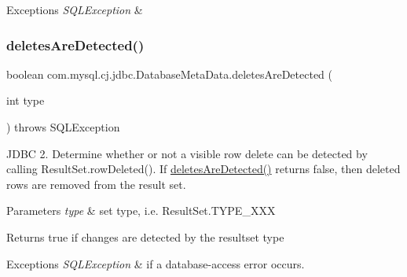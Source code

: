 \begin{DoxyExceptions}{Exceptions}
{\em S\+Q\+L\+Exception} & \\
\hline
\end{DoxyExceptions}
\mbox{\label{classcom_1_1mysql_1_1cj_1_1jdbc_1_1_database_meta_data_ada4d6165180e979eeb0645fadd72aaf9}} 
\subsubsection{\texorpdfstring{deletes\+Are\+Detected()}{deletesAreDetected()}}
{\footnotesize\ttfamily boolean com.\+mysql.\+cj.\+jdbc.\+Database\+Meta\+Data.\+deletes\+Are\+Detected (\begin{DoxyParamCaption}\item[{int}]{type }\end{DoxyParamCaption}) throws S\+Q\+L\+Exception}

J\+D\+BC 2. Determine whether or not a visible row delete can be detected by calling Result\+Set.\+row\+Deleted(). If \mbox{\hyperlink{classcom_1_1mysql_1_1cj_1_1jdbc_1_1_database_meta_data_ada4d6165180e979eeb0645fadd72aaf9}{deletes\+Are\+Detected()}} returns false, then deleted rows are removed from the result set.


\begin{DoxyParams}{Parameters}
{\em type} & set type, i.\+e. Result\+Set.\+T\+Y\+P\+E\+\_\+\+X\+XX \\
\hline
\end{DoxyParams}
\begin{DoxyReturn}{Returns}
true if changes are detected by the resultset type 
\end{DoxyReturn}

\begin{DoxyExceptions}{Exceptions}
{\em S\+Q\+L\+Exception} & if a database-\/access error occurs. \\
\hline
\end{DoxyExceptions}
\mbox{\label{classcom_1_1mysql_1_1cj_1_1jdbc_1_1_database_meta_data_ad8b1533935ccb3f77b745ccce44dd5b9}} 
